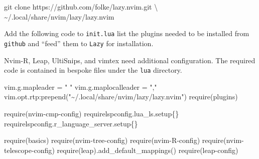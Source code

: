 \documentclass[
  letterpaper,
  DIV=11,
  numbers=noendperiod,
  oneside]{scrartcl}
\newenvironment{Shaded}{\begin{snugshade}}{\end{snugshade}}
\newcommand{\DataTypeTok}[1]{\textcolor[rgb]{0.68,0.00,0.00}{#1}}
\newcommand{\ErrorTok}[1]{\textcolor[rgb]{0.68,0.00,0.00}{#1}}
\newcommand{\ExtensionTok}[1]{\textcolor[rgb]{0.00,0.23,0.31}{#1}}
\newcommand{\FunctionTok}[1]{\textcolor[rgb]{0.28,0.35,0.67}{#1}}
\newcommand{\KeywordTok}[1]{\textcolor[rgb]{0.00,0.23,0.31}{#1}}
\newcommand{\NormalTok}[1]{\textcolor[rgb]{0.00,0.23,0.31}{#1}}
\newcommand{\StringTok}[1]{\textcolor[rgb]{0.13,0.47,0.30}{#1}}
\begin{document}
\begin{Shaded}
\begin{Highlighting}[]
\FunctionTok{git}\NormalTok{ clone https://github.com/folke/lazy.nvim.git }\DataTypeTok{\textbackslash{}}
\NormalTok{   \textasciitilde{}/.local/share/nvim/lazy/lazy.nvim}
\end{Highlighting}
\end{Shaded}

Add the following code to \texttt{init.lua} list the plugins needed to
be installed from \texttt{github} and ``feed'' them to \texttt{Lazy} for
installation.

Nvim-R, Leap, UltiSnips, and vimtex need additional configuration. The
required code is contained in bespoke files under the \texttt{lua}
directory.

\begin{Shaded}
\begin{Highlighting}[]


\ExtensionTok{vim.g.mapleader}\NormalTok{ = }\StringTok{" "}
\ExtensionTok{vim.g.maplocalleader}\NormalTok{ = }\StringTok{","}
\ExtensionTok{vim.opt.rtp:prepend}\ErrorTok{(}\StringTok{"\textasciitilde{}/.local/share/nvim/lazy/lazy.nvim"}\KeywordTok{)}
\ExtensionTok{require}\ErrorTok{(}\StringTok{\textquotesingle{}plugins\textquotesingle{}}\KeywordTok{)}

\ExtensionTok{require}\ErrorTok{(}\StringTok{\textquotesingle{}nvim{-}cmp{-}config\textquotesingle{}}\KeywordTok{)}
\ExtensionTok{require}\StringTok{\textquotesingle{}lspconfig\textquotesingle{}}\ExtensionTok{.lua\_ls.setup\{\}}
\ExtensionTok{require}\StringTok{\textquotesingle{}lspconfig\textquotesingle{}}\ExtensionTok{.r\_language\_server.setup\{\}}

\ExtensionTok{require}\ErrorTok{(}\StringTok{\textquotesingle{}basics\textquotesingle{}}\KeywordTok{)}
\ExtensionTok{require}\ErrorTok{(}\StringTok{\textquotesingle{}nvim{-}tree{-}config\textquotesingle{}}\KeywordTok{)}
\ExtensionTok{require}\ErrorTok{(}\StringTok{\textquotesingle{}nvim{-}R{-}config\textquotesingle{}}\KeywordTok{)}
\ExtensionTok{require}\ErrorTok{(}\StringTok{\textquotesingle{}nvim{-}telescope{-}config\textquotesingle{}}\KeywordTok{)}
\ExtensionTok{require}\ErrorTok{(}\StringTok{\textquotesingle{}leap\textquotesingle{}}\KeywordTok{)}\FunctionTok{.add\_default\_mappings()}
\ExtensionTok{require}\ErrorTok{(}\StringTok{\textquotesingle{}leap{-}config\textquotesingle{}}\KeywordTok{)}


\end{Highlighting}
\end{Shaded}
\end{document}

